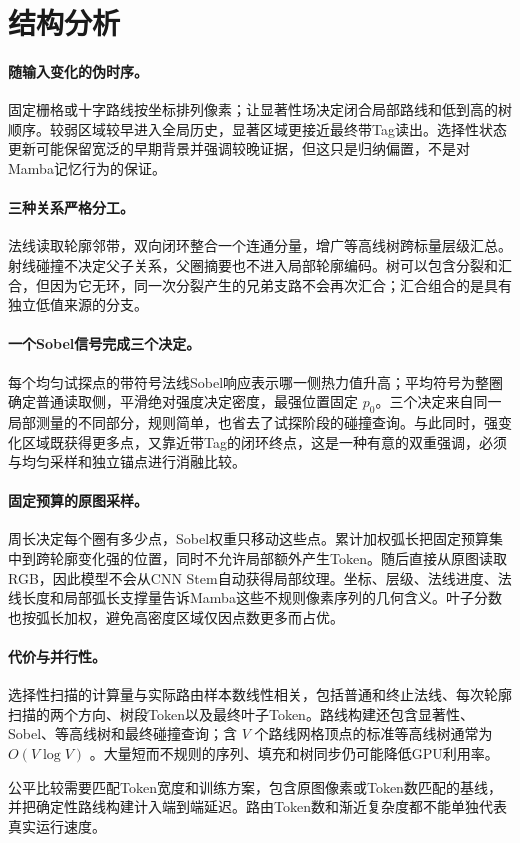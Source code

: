 \section{结构分析}
\label{sec:analysis}

\paragraph{随输入变化的伪时序。}
固定栅格或十字路线按坐标排列像素；\method{}让显著性场决定闭合局部路线和低到高的树顺序。较弱区域较早进入全局历史，显著区域更接近最终带Tag读出。选择性状态更新可能保留宽泛的早期背景并强调较晚证据，但这只是归纳偏置，不是对Mamba记忆行为的保证。

\paragraph{三种关系严格分工。}
法线读取轮廓邻带，双向闭环整合一个连通分量，增广等高线树跨标量层级汇总。射线碰撞不决定父子关系，父圈摘要也不进入局部轮廓编码。树可以包含分裂和汇合，但因为它无环，同一次分裂产生的兄弟支路不会再次汇合；汇合组合的是具有独立低值来源的分支。

\paragraph{一个Sobel信号完成三个决定。}
每个均匀试探点的带符号法线Sobel响应表示哪一侧热力值升高；平均符号为整圈确定普通读取侧，平滑绝对强度决定密度，最强位置固定 $p_0$。三个决定来自同一局部测量的不同部分，规则简单，也省去了试探阶段的碰撞查询。与此同时，强变化区域既获得更多点，又靠近带Tag的闭环终点，这是一种有意的双重强调，必须与均匀采样和独立锚点进行消融比较。

\paragraph{固定预算的原图采样。}
周长决定每个圈有多少点，Sobel权重只移动这些点。累计加权弧长把固定预算集中到跨轮廓变化强的位置，同时不允许局部额外产生Token。随后直接从原图读取RGB，因此模型不会从CNN Stem自动获得局部纹理。坐标、层级、法线进度、法线长度和局部弧长支撑量告诉Mamba这些不规则像素序列的几何含义。叶子分数也按弧长加权，避免高密度区域仅因点数更多而占优。

\paragraph{代价与并行性。}
选择性扫描的计算量与实际路由样本数线性相关，包括普通和终止法线、每次轮廓扫描的两个方向、树段Token以及最终叶子Token。路线构建还包含显著性、Sobel、等高线树和最终碰撞查询；含 $V$ 个路线网格顶点的标准等高线树通常为 $O(V\log V)$ \cite{carr2003contourtrees}。大量短而不规则的序列、填充和树同步仍可能降低GPU利用率。

公平比较需要匹配Token宽度和训练方案，包含原图像素或Token数匹配的基线，并把确定性路线构建计入端到端延迟。路由Token数和渐近复杂度都不能单独代表真实运行速度。
